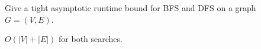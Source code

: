 \question Give a tight asymptotic runtime bound for BFS and DFS on a graph $G =
(V, E)$.

\begin{solution}[0.5in]
$O(|V| + |E|)$ for both searches.
\end{solution}
